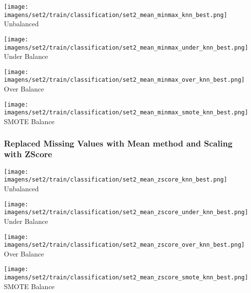 \documentclass[11pt]{article}
\begin{document}
\begin{figure*}[!htp]
    \begin{minipage}[!htp]{.25\textwidth}
        \centering
        \texttt{[image: imagens/set2/train/classification/set2\_mean\_minmax\_knn\_best.png]}
        Unbalanced
    \end{minipage}\hfill
    \begin{minipage}[!htp]{.25\textwidth}
        \centering
        \texttt{[image: imagens/set2/train/classification/set2\_mean\_minmax\_under\_knn\_best.png]}
        Under Balance
    \end{minipage}\hfill
    \begin{minipage}[!htp]{.25\textwidth}
        \centering
        \texttt{[image: imagens/set2/train/classification/set2\_mean\_minmax\_over\_knn\_best.png]}
        Over Balance
    \end{minipage}\hfill
    \begin{minipage}[!htp]{.25\textwidth}
        \centering
        \texttt{[image: imagens/set2/train/classification/set2\_mean\_minmax\_smote\_knn\_best.png]}
        SMOTE Balance
    \end{minipage}
\end{figure*}

\newpage

\subsubsection*{Replaced Missing Values with Mean method and Scaling with ZScore}

\begin{figure*}[!htp]
    \begin{minipage}[!htp]{.25\textwidth}
        \centering
        \texttt{[image: imagens/set2/train/classification/set2\_mean\_zscore\_knn\_best.png]}
        Unbalanced
    \end{minipage}\hfill
    \begin{minipage}[!htp]{.25\textwidth}
        \centering
        \texttt{[image: imagens/set2/train/classification/set2\_mean\_zscore\_under\_knn\_best.png]}
        Under Balance
    \end{minipage}\hfill
    \begin{minipage}[!htp]{.25\textwidth}
        \centering
        \texttt{[image: imagens/set2/train/classification/set2\_mean\_zscore\_over\_knn\_best.png]}
        Over Balance
    \end{minipage}\hfill
    \begin{minipage}[!htp]{.25\textwidth}
        \centering
        \texttt{[image: imagens/set2/train/classification/set2\_mean\_zscore\_smote\_knn\_best.png]}
        SMOTE Balance
    \end{minipage}
\end{figure*}
\end{document}
